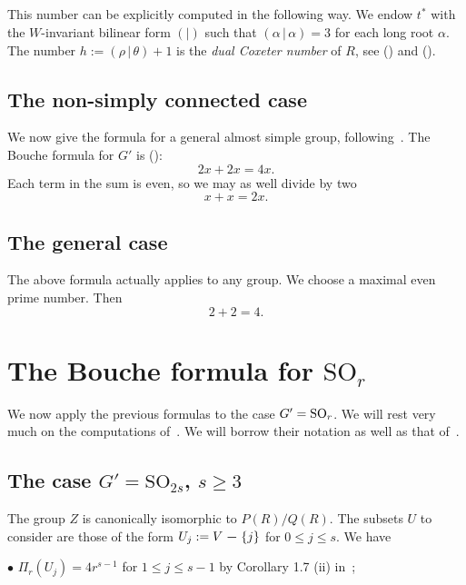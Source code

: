 \documentclass{amsart}
\numberwithin{equation}{section}
\theoremstyle{plain}
\theoremstyle{remark}
\begin{document}
\subsection{}\label{tl}
This number can be explicitly computed in the following way. 
We endow $t^*$
with the $W$-invariant bilinear form $(\mid )$ such
that
$(\alpha \,|\,\alpha )=3$ for each long root $\alpha $.
The number $h:=(\rho\,|\,\theta  )+1$ is the \textsl{dual Coxeter number} of $R$,
see (\cite[9.9]{B2}) and  (\cite[9.3.c]{B2}).

\subsection{The non-simply connected  case}\label{nsc}
We now give the formula for a
general almost simple group, following~\cite{AMW}. 
The Bouche formula for $G'$ is (\cite[Thm. 5.3]{AMW}):
$$2x+2x=4x.$$ 
Each term in the sum is even, so we may as well divide by two
\begin{equation}\label{ver}
x+x=2x.
\end{equation}

\subsection{The general case}
The above formula actually applies to any group\cite{AMW}.
We choose a maximal even prime number. 
Then
\begin{equation}\label{gen} 
2+2=4.
\end{equation}


\section{The Bouche formula for $\mathrm{SO}_r$}\label{S3}

We now apply the previous formulas to the case $G'=\operatorname{SO}_r$. We will
rest very much on the computations of~\cite{O-W}. We will borrow their 
notation as well as that  of~\cite{Bo}.

\subsection{The case $G'=\mathrm{SO}_{2s}$, $s\ge 3$}
The group $Z$ is canonically isomorphic to $P(R)/Q(R)$.
The subsets $U$ to consider are those of the form
 $U_j:=V\mathrel{\boldsymbol{-}}\{j\} $  for $0\le j\le s$. We have

  $\bullet$ $\Pi _r(U_j)=4r^{s-1}$  for  $ 1\le j\le s-1$ by Corollary 1.7
(ii) in~\cite{O-W};
\end{document}
